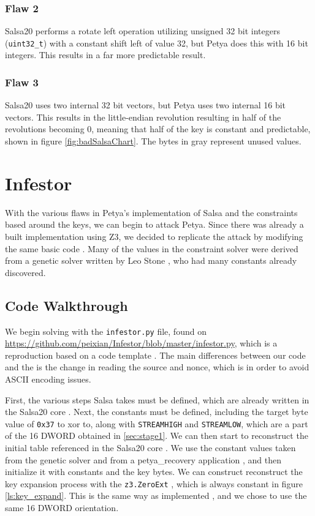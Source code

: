 \documentclass[twocolumn]{article}
\newcommand{\code}[1]{\texttt{#1}}
\begin{document}
\subsubsection{Flaw 2}
Salsa20 performs a rotate left operation utilizing unsigned 32 bit integers (\code{uint32\_t}) \cite{salsa20} with a constant shift left of value 32, but Petya does this with 16 bit integers. This results in a far more predictable result.

\subsubsection{Flaw 3}
Salsa20 uses two internal 32 bit vectors, but Petya uses two internal 16 bit vectors. This results in the little-endian revolution resulting in half of the revolutions becoming 0, meaning that half of the key is constant and predictable, shown in figure \ref{fig:badSalsaChart}. The bytes in gray represent unused values. 


\section{Infestor}
\label{sec:infestor}
With the various flaws in Petya's implementation of Salsa and the constraints based around the keys, we can begin to attack Petya. Since there was already a built implementation using Z3, we decided to replicate the attack by modifying the same basic code \cite{codeTemplate}. Many of the values in the constraint solver were derived from a genetic solver written by Leo Stone \cite{geneticSolver}, who had many constants already discovered.

\subsection{Code Walkthrough}

We begin solving with the \code{infestor.py} file, found on \url{https://github.com/peixian/Infestor/blob/master/infestor.py}, which is a reproduction based on a code template \cite{codeTemplate}. The main differences between our code and the \cite{codeTemplate} is the change in reading the source and nonce, which is in order to avoid ASCII encoding issues. 

First, the various steps Salsa takes must be defined, which are already written in the Salsa20 core \cite{salsa20Core}. Next, the constants must be defined, including the target byte value of \code{0x37} to xor to, along with \code{STREAMHIGH} and \code{STREAMLOW}, which are a part of the 16 DWORD obtained in \ref{sec:stage1}. We can then start to reconstruct the initial table referenced in the Salsa20 core \cite{salsa20Core}. We use the constant values taken from the genetic solver \cite{geneticSolver} and from a petya\_recovery application \cite{petyaRecovery}, and then initialize it with constants and the key bytes. We can construct reconstruct the key expansion process with the \code{z3.ZeroExt} \cite{z3Guide}, which is always constant in figure \ref{ls:key_expand}. This is the same way as implemented \cite{codeTemplate}, and we chose to use the same 16 DWORD orientation. 
\end{document}
